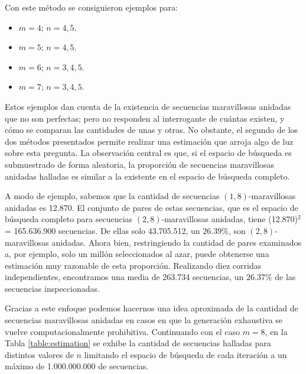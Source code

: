 \begin{itemize}
	Con este método se consiguieron ejemplos para:
	\begin{itemize}
		\item $m = 4$; $n = 4, 5$.
		\item $m = 5$; $n = 4, 5$.
		\item $m = 6$; $n = 3, 4, 5$.
		\item $m = 7$; $n = 3, 4, 5$.
	\end{itemize}
\end{itemize}

Estos ejemplos dan cuenta de la existencia de secuencias maravillosas anidadas
que no son perfectas; pero no responden al interrogante de cuántas
existen, y cómo se comparan las cantidades de unas y otras.
No obstante, el segundo de los dos métodos presentados permite realizar una
estimación que arroja algo de luz sobre esta pregunta. La observación central
es que, si el espacio de búsqueda es submuestrado de forma aleatoria,
la proporción de secuencias maravillosas anidadas halladas es similar
a la existente en el espacio de búsqueda completo.

A modo de ejemplo, sabemos que la cantidad de secuencias $(1,8)$-maravillosas
anidadas es 12.870. El conjunto de pares de estas secuencias, que es el espacio
de búsqueda completo para secuencias $(2,8)$-maravillosas anidadas, tiene
(12.870)$^2$ = 165.636.900 secuencias. De ellas solo 43.705.512, un $26.39\%$,
son $(2,8)$-maravillosas anidadas. Ahora bien, restringiendo la cantidad de
pares examinados a, por ejemplo, solo un millón seleccionados al azar, puede
obtenerse una estimación muy razonable de esta proporción. Realizando diez
corridas independientes, encontramos una media de 263.734 secuencias,
un $26.37\%$ de las secuencias inspeccionadas.

Gracias a este enfoque podemos hacernos una idea aproximada de la cantidad
de secuencias maravillosas anidadas en casos en que la generación exhaustiva
se vuelve computacionalmente prohibitiva. Continuando con el caso $m = 8$,
en la Tabla \ref{table:estimation} se exhibe la cantidad de secuencias halladas para distintos
valores de $n$ limitando el espacio de búsqueda de cada iteración a un máximo
de 1.000.000.000 de secuencias.

